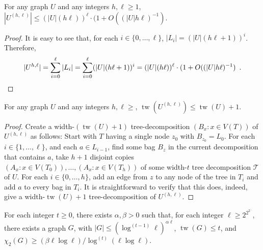 \documentclass[kpfonts]{patmorin}
\DeclareMathOperator{\tw}{tw}
\newcommand{\uqs}{\chi_2}
\begin{document}
\begin{lem}\label{boost-size}
    For any graph $U$ and any integers $h,\ell \ge 1$, $|U^{(h,\ell)}| \le (|U|(h\ell))^{\ell}\cdot (1+O((|U|h\ell)^{-1})$.
\end{lem}

\begin{proof}
    It is easy to see that, for each $i\in \{0,\ldots,\ell\}$, $|L_i|=(|U|(h\ell+1))^i$.  Therefore,
    \[ |U^{h,\ell}| = \sum_{i=0}^\ell |L_i| = \sum_{i=0}^\ell (|U|(h\ell+1))^i = (|U|(h\ell))^{\ell}\cdot (1+O((|U|h\ell)^{-1}) \enspace . \qedhere
    \]
\end{proof}


\begin{lem}\label{boost-treewidth}
    For any graph $U$ and any integers $h,\ell\ge$, $\tw(U^{(h,\ell)})\le \tw(U)+1$.
\end{lem}

\begin{proof}
  Create a width-$(\tw(U)+1)$ tree-decomposition $(B_x:x\in V(T))$ of $U^{(h,\ell)}$ as follows: Start with $T$ having a single node $z_0$ with $B_{z_0}=L_0$.  For each $i\in\{1,\ldots,\ell\}$, and each $a\in L_{i-1}$, find some bag $B_z$ in the current decomposition that contains $a$, take $h+1$ disjoint copies $(A_x:x\in V(T_0)),\ldots,(A_x:x\in V(T_h))$ of some width-$t$ tree decomposition $\mathcal{T}$ of $U$.  For each $i\in\{0,\ldots,h\}$, add an edge from $z$ to any node of the tree in $T_i$ and add $a$ to every bag in $T_i$.  It is straightforward to verify that this does, indeed, give a width-$\tw(U)+1$ tree-decomposition of $U^{(h,\ell)}$.
\end{proof}


\begin{thm}\label{treewidth-lower-bound}
    For each integer $t\ge 0$, there exists $\alpha,\beta>0$
    such that, for each integer $\ell\ge 2^{2^{2^{\ddots}}}$, there exists a graph $G$, with $|G|\le (\log^{(t-1)}\ell)^{\alpha\ell}$, $\tw(G)\le t$, and $\uqs(G)\ge (\beta\ell\log\ell)/\log^{(t)}(\ell\log\ell)$.
\end{thm}
\end{document}

